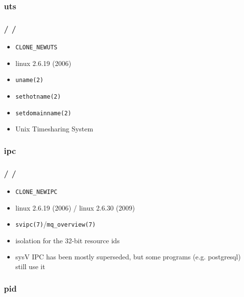 \documentclass{beamer}
\newcommand{\autotitle}
{\frametitle{
    \secname
    \ifx\insertsubsection\empty
    \else
        /\subsecname
        \ifx\insertsubsubsection\empty\else/\subsubsecname\fi
    \fi}}
\begin{document}
\subsubsection{uts}

\begin{frame}
    \autotitle
    \begin{itemize}
        \item \texttt{CLONE\_NEWUTS}
        \item linux 2.6.19 (2006)
        \item \texttt{uname(2)}
        \item \texttt{sethotname(2)}
        \item \texttt{setdomainname(2)}
        \item Unix Timesharing System
    \end{itemize}
\end{frame}

\subsubsection{ipc}

\begin{frame}
    \autotitle
    \begin{itemize}
        \item \texttt{CLONE\_NEWIPC}
        \item linux 2.6.19 (2006) / linux 2.6.30 (2009)
        \item \texttt{svipc(7)}/\texttt{mq\_overview(7)}
        \item isolation for the 32-bit resource ids
        \item
            sysV IPC has been mostly superseded, but some programs (e.g.
            postgresql) still use it
    \end{itemize}
\end{frame}

\subsubsection{pid}
\end{document}
